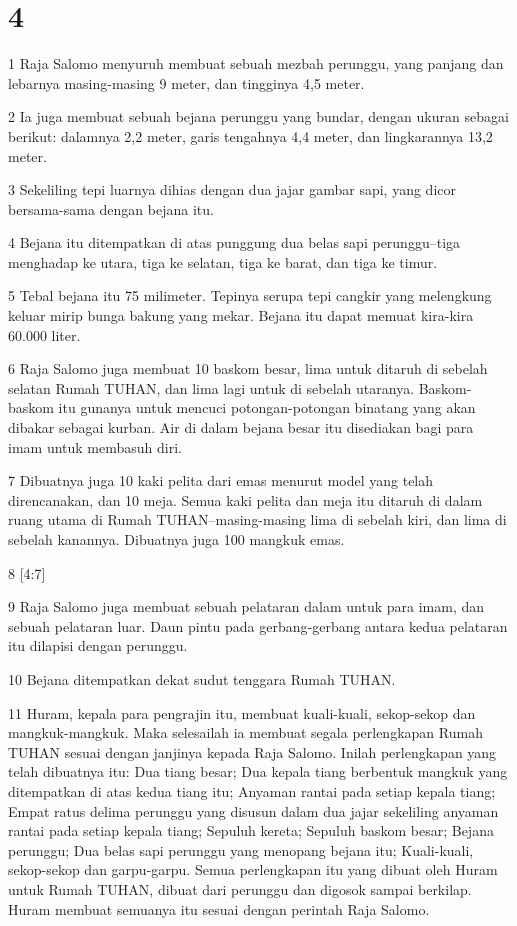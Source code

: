 \chapter{4}

\par 1 Raja Salomo menyuruh membuat sebuah mezbah perunggu, yang panjang dan lebarnya masing-masing 9 meter, dan tingginya 4,5 meter.
\par 2 Ia juga membuat sebuah bejana perunggu yang bundar, dengan ukuran sebagai berikut: dalamnya 2,2 meter, garis tengahnya 4,4 meter, dan lingkarannya 13,2 meter.
\par 3 Sekeliling tepi luarnya dihias dengan dua jajar gambar sapi, yang dicor bersama-sama dengan bejana itu.
\par 4 Bejana itu ditempatkan di atas punggung dua belas sapi perunggu--tiga menghadap ke utara, tiga ke selatan, tiga ke barat, dan tiga ke timur.
\par 5 Tebal bejana itu 75 milimeter. Tepinya serupa tepi cangkir yang melengkung keluar mirip bunga bakung yang mekar. Bejana itu dapat memuat kira-kira 60.000 liter.
\par 6 Raja Salomo juga membuat 10 baskom besar, lima untuk ditaruh di sebelah selatan Rumah TUHAN, dan lima lagi untuk di sebelah utaranya. Baskom-baskom itu gunanya untuk mencuci potongan-potongan binatang yang akan dibakar sebagai kurban. Air di dalam bejana besar itu disediakan bagi para imam untuk membasuh diri.
\par 7 Dibuatnya juga 10 kaki pelita dari emas menurut model yang telah direncanakan, dan 10 meja. Semua kaki pelita dan meja itu ditaruh di dalam ruang utama di Rumah TUHAN--masing-masing lima di sebelah kiri, dan lima di sebelah kanannya. Dibuatnya juga 100 mangkuk emas.
\par 8 [4:7]
\par 9 Raja Salomo juga membuat sebuah pelataran dalam untuk para imam, dan sebuah pelataran luar. Daun pintu pada gerbang-gerbang antara kedua pelataran itu dilapisi dengan perunggu.
\par 10 Bejana ditempatkan dekat sudut tenggara Rumah TUHAN.
\par 11 Huram, kepala para pengrajin itu, membuat kuali-kuali, sekop-sekop dan mangkuk-mangkuk. Maka selesailah ia membuat segala perlengkapan Rumah TUHAN sesuai dengan janjinya kepada Raja Salomo. Inilah perlengkapan yang telah dibuatnya itu: Dua tiang besar; Dua kepala tiang berbentuk mangkuk yang ditempatkan di atas kedua tiang itu; Anyaman rantai pada setiap kepala tiang; Empat ratus delima perunggu yang disusun dalam dua jajar sekeliling anyaman rantai pada setiap kepala tiang; Sepuluh kereta; Sepuluh baskom besar; Bejana perunggu; Dua belas sapi perunggu yang menopang bejana itu; Kuali-kuali, sekop-sekop dan garpu-garpu. Semua perlengkapan itu yang dibuat oleh Huram untuk Rumah TUHAN, dibuat dari perunggu dan digosok sampai berkilap. Huram membuat semuanya itu sesuai dengan perintah Raja Salomo.
